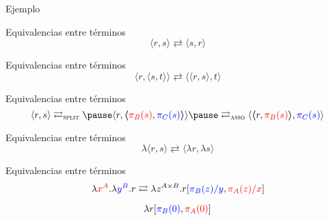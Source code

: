 \begin{frame}{Ejemplo}
\end{frame}

\begin{frame}{Equivalencias entre términos}
	\[ \langle r,s \rangle \rightleftarrows \langle s,r \rangle \]
\end{frame}

\begin{frame}{Equivalencias entre términos}
	\[ \langle r,\langle s,t \rangle \rangle \rightleftarrows \langle \langle r,s \rangle,t \rangle \]
\end{frame}

\begin{frame}{Equivalencias entre términos}	
	\[ \langle r,s \rangle \rightleftarrows_{\textsc{split}} \pause \langle r, \boldsymbol{\langle} \textcolor{red}{\pi_B(s)}, \textcolor{blue}{\pi_C(s)} \boldsymbol{\rangle} \rangle \pause \rightleftarrows_{\textsc{asso}} \langle \boldsymbol{\langle} r, \textcolor{red}{\pi_B(s)} \boldsymbol{\rangle}, \textcolor{blue}{\pi_C(s)} \rangle \]
	\pause
\end{frame}

\begin{frame}{Equivalencias entre términos}	
	\[ \lambda \langle r, s \rangle \rightleftarrows \langle \lambda r, \lambda s \rangle \]
\end{frame}

\iffalse
\begin{frame}{Equivalencias entre términos}	
	\begin{tikzpicture}[overlay, remember picture, shift=(current page.south west)]
		\only<2>{\draw[red,thick,rounded corners] (1.76389, 4.94405) rectangle (3.73944, 4.59127);}
		\only<2>{\draw[red,thick,rounded corners] (7.44361, 5.0146) rectangle (9.38389, 4.55599);}
	\end{tikzpicture}
	\ExecuteMetaData[code/iso_term.tex]{cong-pair}
\end{frame}
\fi

\begin{frame}{Equivalencias entre términos}	
	\[ \lambda \textcolor{red}{x^A}. \lambda \textcolor{blue}{y^B}. r \rightleftarrows \lambda z^{A \times B}. r[\textcolor{blue}{\pi_B(z)/y}, \textcolor{red}{\pi_A(z)/x}] \]

	\pause
	\[ \lambda r[\textcolor{blue}{\pi_B(0)}, \textcolor{red}{\pi_A(0)}] \]
	
	\pause
	
	\pause
\end{frame}

